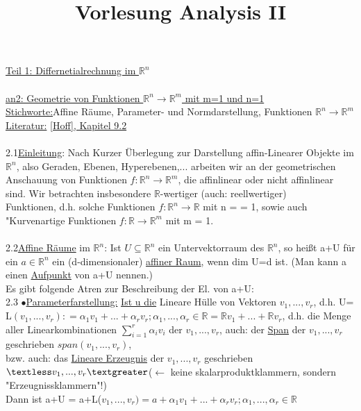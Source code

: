 \documentclass[]{scrartcl}
\title{Vorlesung Analysis II}
\begin{document}
\maketitle
\underline{Teil 1: Differnetialrechnung im $\mathbb{R}^n$}\\
\\
\underline{an2: Geometrie von Funktionen $\mathbb{R}^n\rightarrow\mathbb{R}^m$ 
mit m=1 und n=1}\\
\underline{Stichworte:}Affine Räume, Parameter- und Normdarstellung, Funktionen 
$\mathbb{R}^n\rightarrow\mathbb{R}^m$\\
\underline{Literatur:} \ul{[Hoff], Kapitel 9.2}\\
\\
2.1\underline{Einleitung}: Nach Kurzer Überlegung zur Darstellung 
affin-Linearer Objekte im $\mathbb{R}^n$, also Geraden, Ebenen, Hyperebenen,... 
arbeiten wir an der geometrischen Anschauung von Funktionen 
$f:\mathbb{R}^n\rightarrow\mathbb{R}^m$, die affinlinear oder nicht affinlinear 
sind. Wir betrachten insbesondere $\mathbb{R}$-wertiger (auch: reellwertiger)\\
Funktionen, d.h. solche Funktionen $f:\mathbb{R}^n\rightarrow\mathbb{R}$ mit n 
= = 1, sowie auch "Kurvenartige Funktionen $f: 
\mathbb{R}\rightarrow\mathbb{R}^m$ mit m = 1.\\\\
2.2\underline{Affine Räume} im $\mathbb{R}^n$: Ist $U\subseteq\mathbb{R}^n$ ein 
Untervektorraum des $\mathbb{R}^n$, so heißt a+U für ein $a\in \mathbb{R}^n$ 
ein (d-dimensionaler)  \ul{affiner Raum}, wenn dim U=d ist. 
(Man kann a einen \ul{Aufpunkt} von a+U nennen.)\\
Es gibt folgende Atren zur Beschreibung der El. von a+U:\\
2.3 $\bullet$\underline{Parameterfarstellung:} \ul{Ist u die} Lineare Hülle von 
Vektoren $v_1,...,v_r$, d.h. U= L$(v_1,...,v_r) : = {\alpha_1 v_1+...+\alpha_r 
v_r; \alpha_1,...,\alpha_r\in\mathbb{R}} = \mathbb{R}v_1+...+\mathbb{R}v_r$, 
d.h. die Menge aller Linearkombinationen $\sum_{i=1}^{r}\alpha_i v_i$ der 
$v_1,...,v_r$, auch: der \ul{Span} der $v_1,...,v_r$ geschrieben 
 \ul{$span(v_1,...,v_r)$},\\
bzw. auch: das  \ul{Lineare Erzeugnis} der $v_1,...,v_r$ 
geschrieben$\textless v_1,...,v_r\textgreater$($\leftarrow$ keine 
skalarproduktklammern, sondern "Erzeugnissklammern"!)\\
Dann ist a+U = a+L($v_1,...,v_r) = {a+\alpha_1 v_1 +...+ \alpha_r v_r; 
\alpha_1,...,\alpha_r\in \mathbb{R}}$\\
\end{document}
